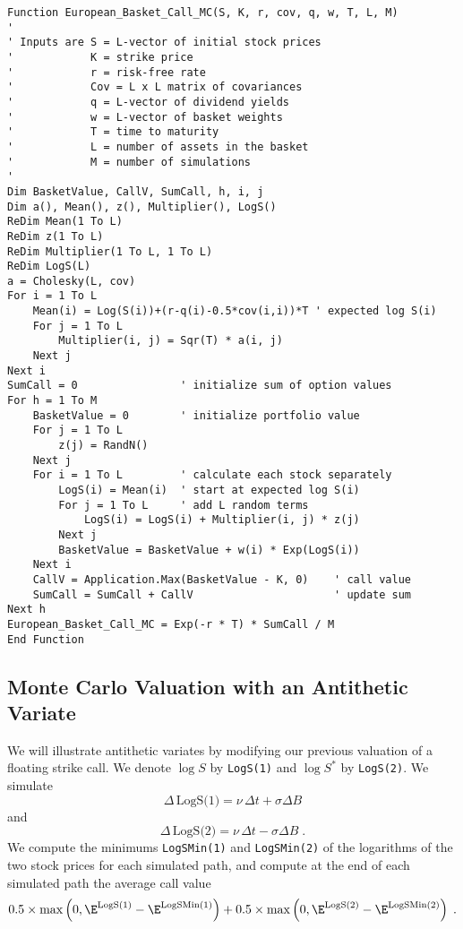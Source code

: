 \small\begin{verbatim}
Function European_Basket_Call_MC(S, K, r, cov, q, w, T, L, M)
'
' Inputs are S = L-vector of initial stock prices
'            K = strike price
'            r = risk-free rate
'            Cov = L x L matrix of covariances
'            q = L-vector of dividend yields
'            w = L-vector of basket weights
'            T = time to maturity
'            L = number of assets in the basket
'            M = number of simulations
'
Dim BasketValue, CallV, SumCall, h, i, j
Dim a(), Mean(), z(), Multiplier(), LogS()
ReDim Mean(1 To L)
ReDim z(1 To L)
ReDim Multiplier(1 To L, 1 To L)
ReDim LogS(L)
a = Cholesky(L, cov)
For i = 1 To L
    Mean(i) = Log(S(i))+(r-q(i)-0.5*cov(i,i))*T ' expected log S(i)
    For j = 1 To L
        Multiplier(i, j) = Sqr(T) * a(i, j)
    Next j
Next i
SumCall = 0                ' initialize sum of option values
For h = 1 To M
    BasketValue = 0        ' initialize portfolio value
    For j = 1 To L
        z(j) = RandN()
    Next j
    For i = 1 To L         ' calculate each stock separately
        LogS(i) = Mean(i)  ' start at expected log S(i)
        For j = 1 To L     ' add L random terms
            LogS(i) = LogS(i) + Multiplier(i, j) * z(j)  
        Next j
        BasketValue = BasketValue + w(i) * Exp(LogS(i))  
    Next i
    CallV = Application.Max(BasketValue - K, 0)    ' call value
    SumCall = SumCall + CallV                      ' update sum
Next h
European_Basket_Call_MC = Exp(-r * T) * SumCall / M
End Function
\end{verbatim}\normalsize





\subsection*{Monte Carlo Valuation with an Antithetic Variate}

We will illustrate antithetic variates by modifying our previous valuation of a floating strike call.  We denote $\log S$ by \verb!LogS(1)! and $\log S^*$ by \verb!LogS(2)!.  We simulate 
$$\varDelta \,\text{LogS(1)} = \nu\,\varDelta t + \sigma \varDelta B$$
and
$$\varDelta \,\text{LogS(2)} = \nu\,\varDelta t - \sigma \varDelta B\; .$$
We compute the minimums \verb!LogSMin(1)! and \verb!LogSMin(2)! of the logarithms of the two stock prices for each simulated path,
and compute at the end of each simulated path the average call value
$$0.5 \times \max\left(0,\E^{\text{LogS(1)}} - \E^{\text{LogSMin(1)}}\right) + 0.5 \times \max\left(0,\E^{\text{LogS(2)}} - \E^{\text{LogSMin(2)}}\right)\; .$$


